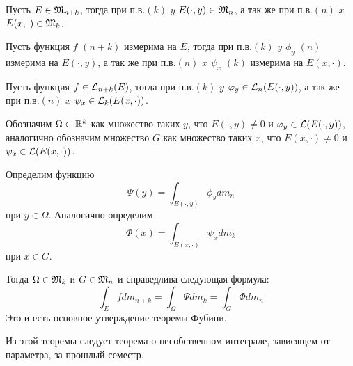 \documentclass[main]{subfiles}
\begin{document}
\begin{proposition}
    Пусть $E \in \mathfrak{M}_{n+k}$, тогда при п.в.$(k)$ $y$ $E(\cdot, y) \in \mathfrak{M}_n$, а так же при п.в.$(n)$ $x$ $E(x, \cdot) \in \mathfrak{M}_k$.
\end{proposition}

\begin{proposition}
    Пусть функция $f$ $(n+k)$ измерима на $E$, тогда при п.в.$(k)$ $y$ $\phi_y$ $(n)$ измерима на $E(\cdot, y)$, а так же при п.в.$(n)$ $x$ $\psi_x$ $(k)$ измерима на $E(x, \cdot)$.
\end{proposition}

\begin{proposition}
    Пусть функция $f \in \mathcal{L}_{n+k}(E)$, тогда при п.в.$(k)$ $y$ $\varphi_y \in \mathcal{L}_n(E(\cdot, y))$, а так же при п.в.$(n)$ $x$ $\psi_x \in \mathcal{L}_k(E(x, \cdot))$.
\end{proposition}

Обозначим $\Omega \subset \mathbb{R}^k$ как множество таких $y$, что $E(\cdot, y) \neq 0$ и $\varphi_y \in \mathcal{L}(E(\cdot, y))$, аналогично обозначим множество $G$ как множество таких $x$, что $E(x, \cdot) \neq 0$ и $\psi_x \in \mathcal{L}(E(x, \cdot))$.

Определим функцию
\[\Psi (y) = \int_{E(\cdot, y)} \phi_y dm_n\]
при $y \in \Omega$.
Аналогично определим
\[\Phi(x) = \int_{E(x, \cdot)} \psi_x dm_k\]
при $x \in G$.

Тогда $\Omega \in \mathfrak{M}_k$ и $G \in \mathfrak{M}_n$ и справедлива следующая формула:
\[
    \int_E f dm_{n+k} = \int_\Omega \Psi dm_k = \int_G \Phi dm_n
\]
Это и есть основное утверждение теоремы Фубини.

Из этой теоремы следует теорема о несобственном интеграле, зависящем от параметра, за прошлый семестр.
\end{document}
